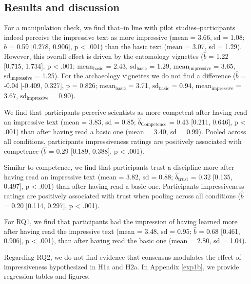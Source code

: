 \documentclass[
  english,
  doc,floatsintext]{apa6}
\begin{document}
\subsection{Results and discussion}\label{results-and-discussion-2}

For a manipulation check, we find that--in line with pilot studies--participants indeed perceive the impressive text as more impressive (mean = 3.66, sd = 1.08; \(\hat{b}\) = 0.59 {[}0.278, 0.906{]}, p \textless{} .001) than the basic text (mean = 3.07, sd = 1.29). However, this overall effect is driven by the entomology vignettes (\(\hat{b}\) = 1.22 {[}0.715, 1.734{]}, p \textless{} .001; \(\text{mean}_{\text{basic}}\) = 2.43, \(\text{sd}_{\text{basic}}\) = 1.29, \(\text{mean}_{\text{impressive}}\) = 3.65, \(\text{sd}_{\text{impressive}}\) = 1.25). For the archaeology vignettes we do not find a difference (\(\hat{b}\) = -0.04 {[}-0.409, 0.327{]}, p = 0.826; \(\text{mean}_{\text{basic}}\) = 3.71, \(\text{sd}_{\text{basic}}\) = 0.94, \(\text{mean}_{\text{impressive}}\) = 3.67, \(\text{sd}_{\text{impressive}}\) = 0.90).

We find that participants perceive scientists as more competent after having read an impressive text (mean = 3.83, sd = 0.85; \(\hat{b}_{\text{Competence}}\) = 0.43 {[}0.211, 0.646{]}, p \textless{} .001) than after having read a basic one (mean = 3.40, sd = 0.99). Pooled across all conditions, participants impressiveness ratings are positively associated with competence (\(\hat{b}\) = 0.29 {[}0.189, 0.388{]}, p \textless{} .001).

Similar to competence, we find that participants trust a discipline more after having read an impressive text (mean = 3.82, sd = 0.88; \(\hat{b}_{\text{trust}}\) = 0.32 {[}0.135, 0.497{]}, p \textless{} .001) than after having read a basic one. Participants impressiveness ratings are positively associated with trust when pooling across all conditions (\(\hat{b}\) = 0.20 {[}0.114, 0.297{]}, p \textless{} .001).

For RQ1, we find that participants had the impression of having learned more after having read the impressive text (mean = 3.48, sd = 0.95; \(\hat{b}\) = 0.68 {[}0.461, 0.906{]}, p \textless{} .001), than after having read the basic one (mean = 2.80, sd = 1.04).

Regarding RQ2, we do not find evidence that consensus modulates the effect of impressiveness hypothesized in H1a and H2a. In Appendix \ref{exp1b}, we provide regression tables and figures.
\end{document}
